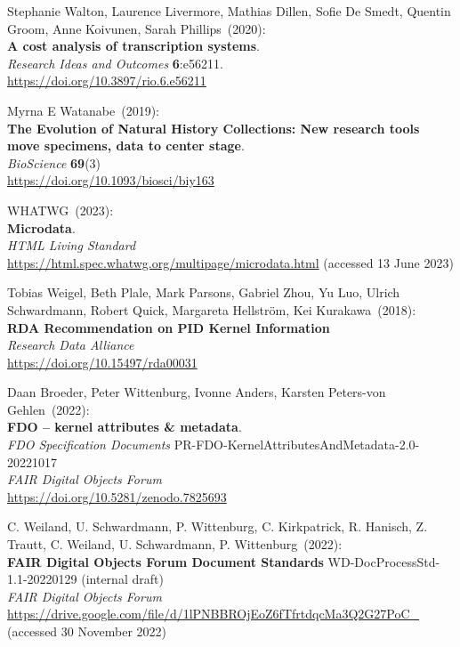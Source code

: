 \begin{thebibliography}{9}
Stephanie Walton, Laurence Livermore, Mathias Dillen, Sofie De Smedt, Quentin Groom, Anne Koivunen, Sarah Phillips~(2020): \\
\textbf{A cost analysis of transcription systems}. \\
\emph{Research Ideas and Outcomes} \textbf{6}:e56211.\\
\url{https://doi.org/10.3897/rio.6.e56211}

Myrna E Watanabe~(2019): \\
\textbf{The Evolution of Natural History Collections:
New research tools move specimens, data to center stage}.\\
\emph{BioScience} \textbf{69}(3)\\
\url{https://doi.org/10.1093/biosci/biy163}

WHATWG~(2023): \\
\textbf{Microdata}. \\
\emph{{HTML Living Standard}}\\
\url{https://html.spec.whatwg.org/multipage/microdata.html} (accessed 13
June 2023)


Tobias Weigel, Beth Plale, Mark Parsons, Gabriel Zhou, Yu Luo, Ulrich
Schwardmann, Robert Quick, Margareta Hellström, Kei Kurakawa~(2018): \\
\textbf{{RDA Recommendation} on {PID Kernel Information}} \\
\emph{Research Data Alliance}\\
\url{https://doi.org/10.15497/rda00031}

Daan Broeder, Peter Wittenburg, Ivonne Anders, Karsten Peters-von
Gehlen~(2022): \\
\textbf{FDO -- kernel attributes \& metadata}.\\ 
\emph{FDO Specification Documents} PR-FDO-KernelAttributesAndMetadata-2.0-20221017 \\
\emph{FAIR Digital Objects Forum}\\
\url{https://doi.org/10.5281/zenodo.7825693}

C. Weiland, U. Schwardmann, P. Wittenburg, C. Kirkpatrick, R. Hanisch,
Z. Trautt, C. Weiland, U. Schwardmann, P. Wittenburg~(2022): \\
\textbf{{FAIR Digital Objects Forum Document Standards}} WD-DocProcessStd-1.1-20220129 (internal draft) \\
\emph{FAIR Digital Objects Forum}\\
\url{https://drive.google.com/file/d/1lPNBBROjEoZ6fTfrtdqcMa3Q2G27PoC_}
(accessed 30 November 2022)


\end{thebibliography}
